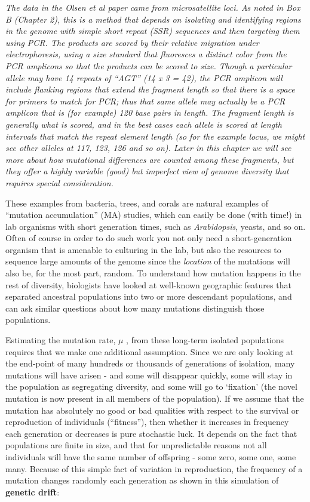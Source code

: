 \documentclass[
]{article}
\begin{document}
\emph{The data in the Olsen et al paper came from microsatellite loci.
As noted in Box B (Chapter 2), this is a method that depends on
isolating and identifying regions in the genome with simple short repeat
(SSR) sequences and then targeting them using PCR. The products are
scored by their relative migration under electrophoresis, using a size
standard that fluoresces a distinct color from the PCR amplicons so that
the products can be scored to size. Though a particular allele may have
14 repeats of ``AGT'' (14 x 3 = 42), the PCR amplicon will include
flanking regions that extend the fragment length so that there is a
space for primers to match for PCR; thus that same allele may actually
be a PCR amplicon that is (for example) 120 base pairs in length. The
fragment length is generally what is scored, and in the best cases each
allele is scored at length intervals that match the repeat element
length (so for the example locus, we might see other alleles at 117,
123, 126 and so on). Later in this chapter we will see more about how
mutational differences are counted among these fragments, but they offer
a highly variable (good) but imperfect view of genome diversity that
requires special consideration.}

These examples from bacteria, trees, and corals are natural examples of
``mutation accumulation'' (MA) studies, which can easily be done (with
time!) in lab organisms with short generation times, such as
\emph{Arabidopsis}, yeasts, and so on. Often of course in order to do
such work you not only need a short-generation organism that is amenable
to culturing in the lab, but also the resources to sequence large
amounts of the genome since the \emph{location} of the mutations will
also be, for the most part, random. To understand how mutation happens
in the rest of diversity, biologists have looked at well-known
geographic features that separated ancestral populations into two or
more descendant populations, and can ask similar questions about how
many mutations distinguish those populations.

Estimating the mutation rate, \(\mu\) , from these long-term isolated
populations requires that we make one additional assumption. Since we
are only looking at the end-point of many hundreds or thousands of
generations of isolation, many mutations will have arisen - and some
will disappear quickly, some will stay in the population as segregating
diversity, and some will go to `fixation' (the novel mutation is now
present in all members of the population). If we assume that the
mutation has absolutely no good or bad qualities with respect to the
survival or reproduction of individuals (``fitness''), then whether it
increases in frequency each generation or decreases is pure stochastic
luck. It depends on the fact that populations are finite in size, and
that for unpredictable reasons not all individuals will have the same
number of offspring - some zero, some one, some many. Because of this
simple fact of variation in reproduction, the frequency of a mutation
changes randomly each generation as shown in this simulation of
\textbf{genetic drift}:
\end{document}
